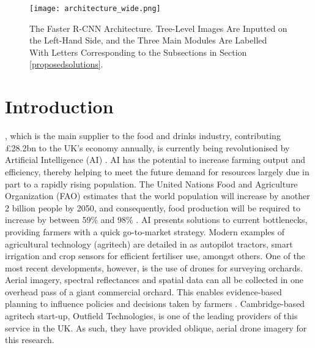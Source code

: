 \documentclass[journal]{IEEEtran}
\begin{document}
\begin{figure*}[h]
    \centering
    \texttt{[image: architecture\_wide.png]}
    \caption{The Faster R-CNN Architecture. Tree-Level Images Are Inputted on the Left-Hand Side, and the Three Main Modules Are Labelled With Letters Corresponding to the Subsections in Section \ref{proposedsolutions}.}
    \label{fig:architecture}
\end{figure*}








\section{Introduction}\label{introduction}

, which is the main supplier to the food and drinks industry, contributing \pounds28.2bn to the UK's economy annually, is currently being revolutionised by Artificial Intelligence (AI) \cite{agricultureintheuk}. AI has the potential to increase farming output and efficiency, thereby helping to meet the future demand for resources largely due in part to a rapidly rising population. The United Nations Food and Agriculture Organization (FAO) estimates that the world population will increase by another 2 billion people by 2050, and consequently, food production will be required to increase by between 59\% and 98\% \cite{aiinagriculture}. AI presents solutions to current bottlenecks, providing farmers with a quick go-to-market strategy. Modern examples of agricultural technology (agritech) are detailed in \cite{modernagriculturaltechnology} as autopilot tractors, smart irrigation and crop sensors for efficient fertiliser use, amongst others. One of the most recent developments, however, is the use of drones for surveying orchards. Aerial imagery, spectral reflectances and spatial data can all be collected in one overhead pass of a giant commercial orchard. This enables evidence-based planning to influence policies and decisions taken by farmers \cite{eyeintheskydronerevolution}. Cambridge-based agritech start-up, Outfield Technologies, is one of the leading providers of this service in the UK. As such, they have provided oblique, aerial drone imagery for this research.
\end{document}
